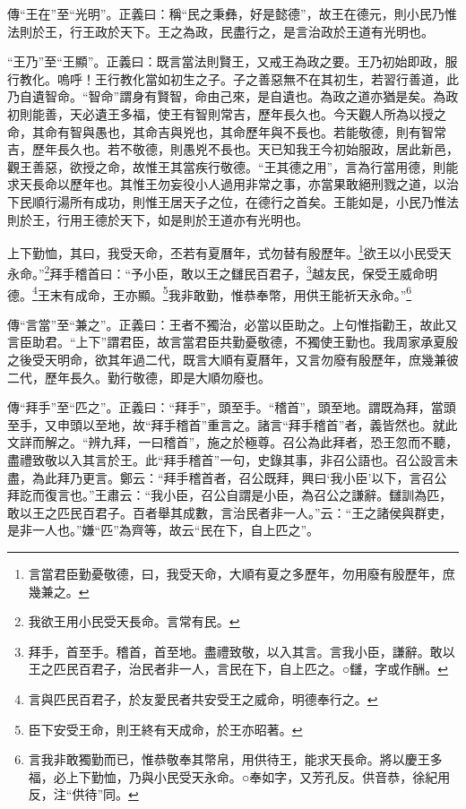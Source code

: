 {\noindent\zhuan{}\fzbyks 傳“王在”至“光明”。正義曰：稱“民之秉彝，好是懿德”，故王在德元，則小民乃惟法則於王，行王政於天下。王之為政，民盡行之，是言治政於王道有光明也。 \par}

{\noindent\shu{}\fzkt “王乃”至“王顯”。正義曰：既言當法則賢王，又戒王為政之要。王乃初始即政，服行教化。嗚呼！王行教化當如初生之子。子之善惡無不在其初生，若習行善道，此乃自遺智命。“智命”謂身有賢智，命由己來，是自遺也。為政之道亦猶是矣。為政初則能善，天必遺王多福，使王有智則常吉，歷年長久也。今天觀人所為以授之命，其命有智與愚也，其命吉與兇也，其命歷年與不長也。若能敬德，則有智常吉，歷年長久也。若不敬德，則愚兇不長也。天已知我王今初始服政，居此新邑，觀王善惡，欲授之命，故惟王其當疾行敬德。“王其德之用”，言為行當用德，則能求天長命以歷年也。其惟王勿妄役小人過用非常之事，亦當果敢絕刑戮之道，以治下民順行湯所有成功，則惟王居天子之位，在德行之首矣。王能如是，小民乃惟法則於王，行用王德於天下，如是則於王道亦有光明也。 \par}

上下勤恤，其曰，我受天命，丕若有夏曆年，式勿替有殷歷年。\footnote{言當君臣勤憂敬德，曰，我受天命，大順有夏之多歷年，勿用廢有殷歷年，庶幾兼之。}欲王以小民受天永命。”\footnote{我欲王用小民受天長命。言常有民。}拜手稽首曰：“予小臣，敢以王之讎民百君子，\footnote{拜手，首至手。稽首，首至地。盡禮致敬，以入其言。言我小臣，謙辭。敢以王之匹民百君子，治民者非一人，言民在下，自上匹之。○讎，字或作酬。}越友民，保受王威命明德。\footnote{言與匹民百君子，於友愛民者共安受王之威命，明德奉行之。}王末有成命，王亦顯。\footnote{臣下安受王命，則王終有天成命，於王亦昭著。}我非敢勤，惟恭奉幣，用供王能祈天永命。”\footnote{言我非敢獨勤而已，惟恭敬奉其幣帛，用供待王，能求天長命。將以慶王多福，必上下勤恤，乃與小民受天永命。○奉如字，又芳孔反。供音恭，徐紀用反，注“供待”同。}


{\noindent\zhuan{}\fzbyks 傳“言當”至“兼之”。正義曰：王者不獨治，必當以臣助之。上句惟指勸王，故此又言臣助君。“上下”謂君臣，故言當君臣共勤憂敬德，不獨使王勤也。我周家承夏殷之後受天明命，欲其年過二代，既言大順有夏曆年，又言勿廢有殷歷年，庶幾兼彼二代，歷年長久。勤行敬德，即是大順勿廢也。 \par}

{\noindent\zhuan{}\fzbyks 傳“拜手”至“匹之”。正義曰：“拜手”，頭至手。“稽首”，頭至地。謂既為拜，當頭至手，又申頭以至地，故“拜手稽首”重言之。諸言“拜手稽首”者，義皆然也。就此文詳而解之。“辨九拜，一曰稽首”，施之於極尊。召公為此拜者，恐王忽而不聽，盡禮致敬以入其言於王。此“拜手稽首”一句，史錄其事，非召公語也。召公設言未盡，為此拜乃更言。鄭云：“拜手稽首者，召公既拜，興曰‘我小臣’以下，言召公拜訖而復言也。”王肅云：“我小臣，召公自謂是小臣，為召公之謙辭。讎訓為匹，敢以王之匹民百君子。百者舉其成數，言治民者非一人。”云：“王之諸侯與群吏，是非一人也。”嫌“匹”為齊等，故云“民在下，自上匹之”。 \par}

